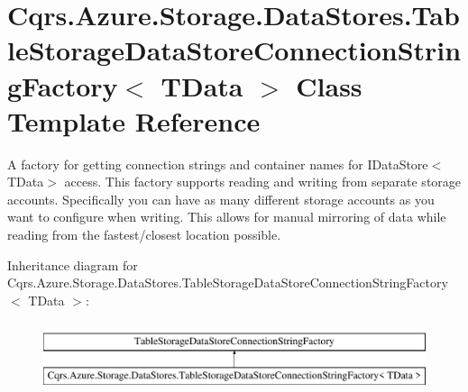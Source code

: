 \hypertarget{classCqrs_1_1Azure_1_1Storage_1_1DataStores_1_1TableStorageDataStoreConnectionStringFactory}{}\section{Cqrs.\+Azure.\+Storage.\+Data\+Stores.\+Table\+Storage\+Data\+Store\+Connection\+String\+Factory$<$ T\+Data $>$ Class Template Reference}
\label{classCqrs_1_1Azure_1_1Storage_1_1DataStores_1_1TableStorageDataStoreConnectionStringFactory}


A factory for getting connection strings and container names for I\+Data\+Store$<$\+T\+Data$>$ access. This factory supports reading and writing from separate storage accounts. Specifically you can have as many different storage accounts as you want to configure when writing. This allows for manual mirroring of data while reading from the fastest/closest location possible.  


Inheritance diagram for Cqrs.\+Azure.\+Storage.\+Data\+Stores.\+Table\+Storage\+Data\+Store\+Connection\+String\+Factory$<$ T\+Data $>$\+:\begin{figure}[H]
\begin{center}
\leavevmode
\includegraphics[height=2.000000cm]{classCqrs_1_1Azure_1_1Storage_1_1DataStores_1_1TableStorageDataStoreConnectionStringFactory}
\end{center}
\end{figure}
